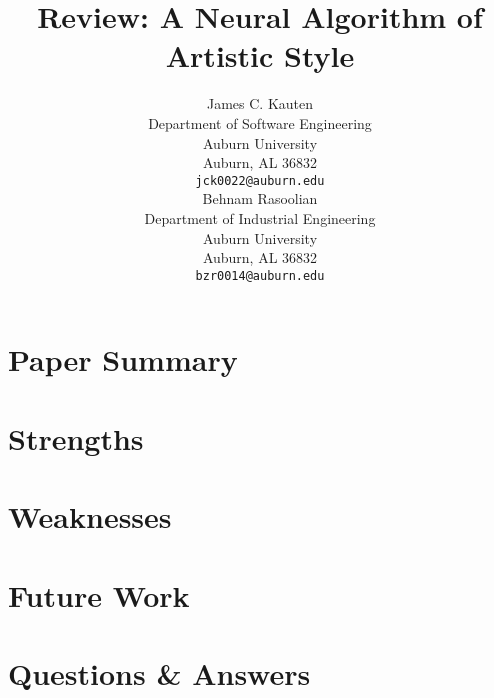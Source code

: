 \documentclass{article}
\begin{document}
\title{Review: A Neural Algorithm of Artistic Style}

\author{
    James C. Kauten \\
    Department of Software Engineering \\
    Auburn University \\
    Auburn, AL 36832 \\
    \texttt{jck0022@auburn.edu} \\
    \And
    Behnam Rasoolian \\
    Department of Industrial Engineering \\
    Auburn University \\
    Auburn, AL 36832 \\
    \texttt{bzr0014@auburn.edu} \\
}

\maketitle

\hypertarget{paper-summary}{%
\section{Paper Summary}\label{paper-summary}}

\cite{gatys2016image}

\hypertarget{strengths}{%
\section{Strengths}\label{strengths}}

\hypertarget{weaknesses}{%
\section{Weaknesses}\label{weaknesses}}

\hypertarget{future-work}{%
\section{Future Work}\label{future-work}}

\hypertarget{qa}{%
\section{Questions \& Answers}\label{qa}}



\end{document}

